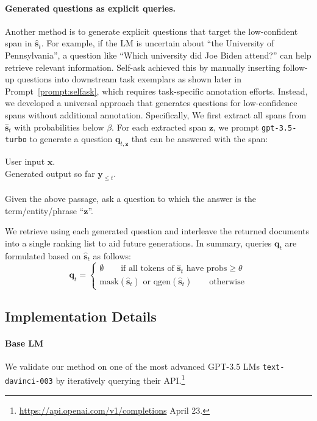\paragraph{Generated questions as explicit queries.} Another method is to generate explicit questions that target the low-confident span in $\hat{\bm{s}}_t$.
For example, if the LM is uncertain about ``the University of Pennsylvania'', a question like ``Which university did Joe Biden attend?'' can help retrieve relevant information.
Self-ask \cite{selfask-press-2022} achieved this by manually inserting follow-up questions into downstream task exemplars as shown later in Prompt~\autoref{prompt:selfask}, which requires task-specific annotation efforts.
Instead, we developed a universal approach that generates questions for low-confidence spans without additional annotation.
Specifically, We first extract all spans from $\hat{\bm{s}}_t$ with probabilities below $\beta$.
For each extracted span $\bm{z}$, we prompt \texttt{gpt-3.5-turbo} to generate a question $\bm{q}_{t,\bm{z}}$ that can be answered with the span:
\begin{prompt}[title={Prompt \thetcbcounter: zero-shot question generation}]
User input $\bm{x}$.\\
Generated output so far $\bm{y}_{\le t}$.\\
\\
Given the above passage, ask a question to which the answer is the term/entity/phrase ``$\bm{z}$''.
\end{prompt}
We retrieve using each generated question and interleave the returned documents into a single ranking list to aid future generations.
In summary, queries $\bm{q}_t$ are formulated based on $\hat{\bm{s}}_t$ as follows:
\begin{equation*}
\bm{q}_t = 
\begin{cases}
\emptyset \quad\quad \text{if all tokens of } \hat{\bm{s}}_t \text{ have probs} \ge \theta \\
\text{mask}(\hat{\bm{s}}_t) \text{ or } \text{qgen}(\hat{\bm{s}}_t) \quad\quad \text{otherwise}
\end{cases}
\end{equation*}

\subsection{Implementation Details}
\paragraph{Base LM} We validate our method on one of the most advanced GPT-3.5 LMs \texttt{text-davinci-003} by iteratively querying their API.\footnote{\url{
https://api.openai.com/v1/completions} April 23.}

